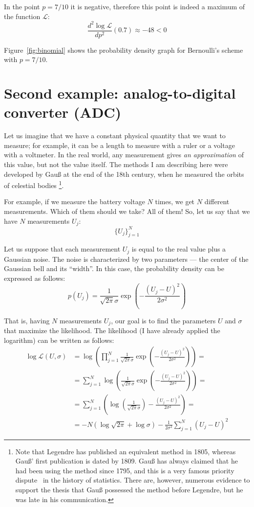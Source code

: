 \documentclass[notitlepage,oneside]{book}
\begin{document}
In the point $p=7/10$ it is negative, therefore this point is indeed a maximum of the function $\mathcal{L}$:
$$\frac{d^2 \log \mathcal{L}}{dp^2}(0.7)  \approx -48 < 0$$

Figure~\ref{fig:binomial} shows the probability density graph for Bernoulli's scheme with $p=7/10$.


\section{Second example: analog-to-digital converter (ADC)}

Let us imagine that we have a constant physical quantity that we want to measure; for example, it can be a length to measure with a ruler or a voltage with a voltmeter.
In the real world, any measurement gives \textit{an approximation} of this value, but not the value itself.
The methods I am describing here were developed by Gauß at the end of the 18th century, when he measured the orbits of celestial bodies
\footnote{Note that Legendre has published an equivalent method in 1805, 
whereas Gauß' first publication is dated by 1809. Gauß has always claimed that he had been using the method since 1795,
and this is a very famous priority dispute~\cite{stigler1981} in the history of statistics.
There are, however, numerous evidence to support the thesis that Gauß possessed the method before Legendre, but he was late in his communication.}.
~\cite{gauss1809theoria}

For example, if we measure the battery voltage $N$ times, we get $N$ different measurements. Which of them should we take? All of them! 
So, let us say that we have $N$ measurements $U_j$:
$$
\{U_j\}_{j=1}^{N}
$$

Let us suppose that each measurement $U_j$ is equal to the real value plus a Gaussian noise. 
The noise is characterized by two parameters --- the center of the Gaussian bell and its ``width''. 
In this case, the probability density can be expressed as follows:
$$
p(U_j) = \frac{1}{\sqrt{2\pi}\sigma} \exp\left(-\frac{(U_j-U)^2}{2\sigma^2}\right)
$$

That is, having $N$ measurements $U_j$, our goal is to find the parameters $U$ and $\sigma$ that maximize the likelihood.
The likelihood (I have already applied the logarithm) can be written as follows:
\begin{align*}
\log \mathcal{L}(U,\sigma) & = \log \left(\prod\limits_{j=1}^N  \frac{1}{\sqrt{2\pi}\sigma} \exp\left(-\frac{(U_j-U)^2}{2\sigma^2}\right)\right) =\\
& = \sum\limits_{j=1}^N \log \left(\frac{1}{\sqrt{2\pi}\sigma} \exp\left(-\frac{(U_j-U)^2}{2\sigma^2}\right)\right) = \\
& = \sum\limits_{j=1}^N \left(\log \left(\frac{1}{\sqrt{2\pi}\sigma}\right) -\frac{(U_j-U)^2}{2\sigma^2}\right) = \\
& = -N \left(\log\sqrt{2\pi} + \log\sigma\right) - \frac{1}{2\sigma^2} \sum\limits_{j=1}^N (U_j-U)^2
\end{align*}
\end{document}
